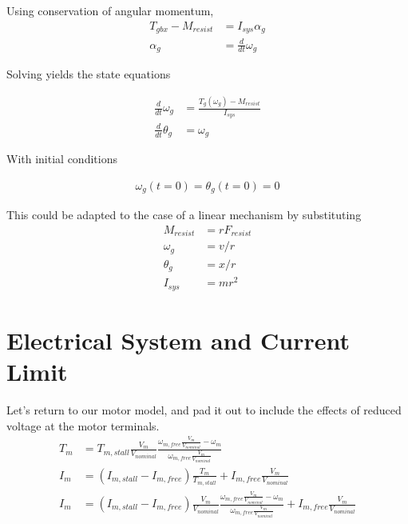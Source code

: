 \documentclass[10pt,letterpaper]{article}
\begin{document}
	Using conservation of angular momentum,
	\begin{align}
		T_{gbx} - M_{resist} &= I_{sys} \alpha_{g} \\
		\alpha_{g} &= \frac{d}{dt} \omega_{g}
	\end{align}

	Solving yields the state equations

	\begin{align}
		\frac{d}{dt} \omega_{g} &= \frac{T_{g}(\omega_{g}) - M_{resist}}{I_{sys}} \\
		\frac{d}{dt} \theta_{g} &= \omega_{g}
	\end{align}

	With initial conditions

	\begin{align}
		\omega_g(t=0) = \theta_g(t=0) = 0 
	\end{align}

	This could be adapted to the case of a linear mechanism by substituting
	\begin{align}
		M_{resist} &= r F_{resist} \\
		\omega_g   &= v / r \\
		\theta_g   &= x / r \\
		I_{sys}    &= m r^2
	\end{align}

	\section{Electrical System and Current Limit}

	Let's return to our motor model, and pad it out to include the effects of reduced voltage at the motor terminals.
	\begin{align} \label{eq:motor_torque_curve}
		T_m &= T_{m,stall} \frac{V_{m}}{V_{nominal}} \frac{\omega_{m,free} \frac{V_{m}}{V_{nominal}}-\omega_m}{\omega_{m,free} \frac{V_{m}}{V_{nominal}}} \\
		I_m &= (I_{m,stall} - I_{m,free}) \frac{T_m}{T_{m,stall}} + I_{m,free} \frac{V_{m}}{V_{nominal}} \\
		I_m  &= (I_{m,stall} - I_{m,free}) \frac{V_{m}}{V_{nominal}} \frac{\omega_{m,free} \frac{V_{m}}{V_{nominal}}-\omega_m}{\omega_{m,free} \frac{V_{m}}{V_{nominal}}} + I_{m,free} \frac{V_{m}}{V_{nominal}} \\
	\end{align}
\end{document}

